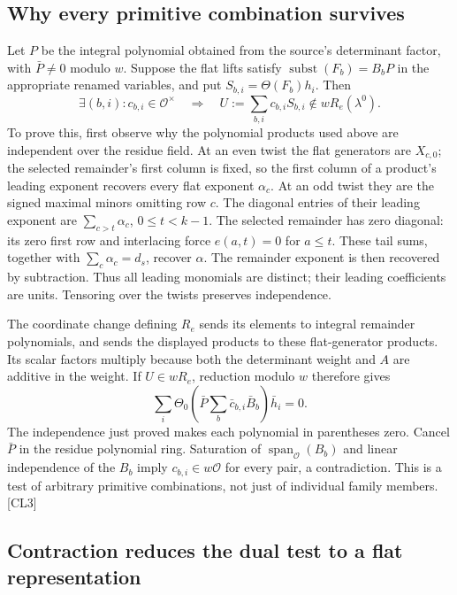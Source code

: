\documentclass[11pt,a4paper]{article}
\numberwithin{equation}{section}
\theoremstyle{remark}\newtheorem{remark}[theorem]{Remark}
\begin{document}
\subsection{Why every primitive combination survives}

Let $P$ be the integral polynomial obtained from the source's determinant factor, with $\bar P\ne0$ modulo $w$. Suppose the flat lifts satisfy $\operatorname{subst}(F_b)=B_bP$ in the appropriate renamed variables, and put $S_{b,i}=\Theta(F_b)h_i$. Then
\[
 \exists(b,i):c_{b,i}\in\mathcal O^\times
 \quad\Longrightarrow\quad
 U:=\sum_{b,i}c_{b,i}S_{b,i}\notin wR_e(\lambda^0).
 \tag{CL.4}\label{eq:cl-primitive}
\]
To prove this, first observe why the polynomial products used above are independent over the residue field. At an even twist the flat generators are $X_{c,0}$; the selected remainder's first column is fixed, so the first column of a product's leading exponent recovers every flat exponent $\alpha_c$. At an odd twist they are the signed maximal minors omitting row $c$. The diagonal entries of their leading exponent are $\sum_{c>t}\alpha_c$, $0\le t<k-1$. The selected remainder has zero diagonal: its zero first row and interlacing force $e(a,t)=0$ for $a\le t$. These tail sums, together with $\sum_c\alpha_c=d_s$, recover $\alpha$. The remainder exponent is then recovered by subtraction. Thus all leading monomials are distinct; their leading coefficients are units. Tensoring over the twists preserves independence.

The coordinate change defining $R_e$ sends its elements to integral remainder polynomials, and sends the displayed products to these flat-generator products. Its scalar factors multiply because both the determinant weight and $A$ are additive in the weight. If $U\in wR_e$, reduction modulo $w$ therefore gives
\[
 \sum_i\Theta_0\!\left(\bar P\sum_b\bar c_{b,i}\bar B_b\right)\bar h_i=0.
\]
The independence just proved makes each polynomial in parentheses zero. Cancel $\bar P$ in the residue polynomial ring. Saturation of $\operatorname{span}_{\mathcal O}(B_b)$ and linear independence of the $B_b$ imply $c_{b,i}\in w\mathcal O$ for every pair, a contradiction. This is a test of arbitrary primitive combinations, not just of individual family members. \textsf{[CL3]}

\subsection{Contraction reduces the dual test to a flat representation}
\end{document}
